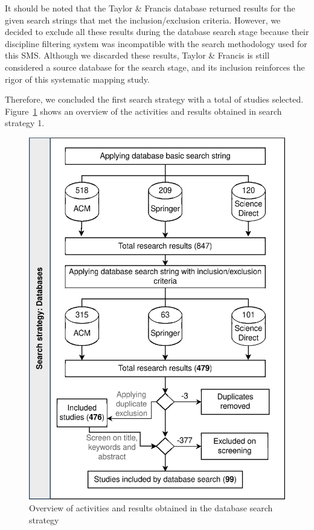 It should be noted that the Taylor \& Francis database returned results for the given search strings that met the inclusion/exclusion criteria. However, we decided to exclude all these results during the database search stage because their discipline filtering system was incompatible with the search methodology used for this SMS. Although we discarded these results, Taylor \& Francis is still considered a source database for the search stage, and its inclusion reinforces the rigor of this systematic mapping study.

Therefore, we concluded the first search strategy with a total of \screenTot{} studies selected. Figure~\ref{fig:overview} shows an overview of the activities and results obtained in search strategy 1.

\begin{figure}[ht]
	\centering
	\includegraphics[scale=0.64]{resources/figures/sms-overview.eps}
	\caption{Overview of activities and results obtained in the database search strategy}
	\label{fig:overview}
\end{figure}

